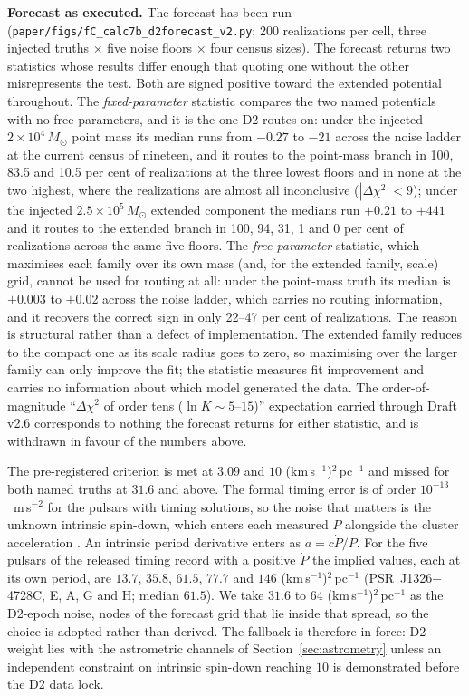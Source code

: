 \documentclass[11pt]{article}
\newcommand{\msun}{\ensuremath{M_\odot}}
\begin{document}
\textbf{Forecast as executed.} The forecast has been run (\texttt{paper/figs/fC\_calc7b\_d2forecast\_v2.py}; 200 realizations per cell, three injected truths $\times$ five noise floors $\times$ four census sizes). The forecast returns two statistics whose results differ enough that quoting one without the other misrepresents the test. Both are signed positive toward the extended potential throughout. The \emph{fixed-parameter} statistic compares the two named potentials with no free parameters, and it is the one D2 routes on: under the injected $2\times10^{4}\,\msun$ point mass its median runs from $-0.27$ to $-21$ across the noise ladder at the current census of nineteen, and it routes to the point-mass branch in 100, 83.5 and 10.5 per cent of realizations at the three lowest floors and in none at the two highest, where the realizations are almost all inconclusive ($|\Delta\chi^{2}|<9$); under the injected $2.5\times10^{5}\,\msun$ extended component the medians run $+0.21$ to $+441$ and it routes to the extended branch in 100, 94, 31, 1 and 0 per cent of realizations across the same five floors. The \emph{free-parameter} statistic, which maximises each family over its own mass (and, for the extended family, scale) grid, cannot be used for routing at all: under the point-mass truth its median is $+0.003$ to $+0.02$ across the noise ladder, which carries no routing information, and it recovers the correct sign in only 22--47 per cent of realizations. The reason is structural rather than a defect of implementation. The extended family reduces to the compact one as its scale radius goes to zero, so maximising over the larger family can only improve the fit; the statistic measures fit improvement and carries no information about which model generated the data. The order-of-magnitude ``$\Delta\chi^{2}$ of order tens ($\ln K \sim 5$--$15$)'' expectation carried through Draft v2.6 corresponds to nothing the forecast returns for either statistic, and is withdrawn in favour of the numbers above.

The pre-registered criterion is met at $3.09$ and $10$ (km\,s$^{-1}$)$^{2}$\,pc$^{-1}$ and missed for both named truths at $31.6$ and above. The formal timing error is of order $10^{-13}$~m\,s$^{-2}$ for the pulsars with timing solutions, so the noise that matters is the unknown intrinsic spin-down, which enters each measured $\dot P$ alongside the cluster acceleration \citep{ColomiBernadich2026}. An intrinsic period derivative enters as $a = c\dot P/P$. For the five pulsars of the released timing record with a positive $\dot P$ the implied values, each at its own period, are $13.7$, $35.8$, $61.5$, $77.7$ and $146$ (km\,s$^{-1}$)$^{2}$\,pc$^{-1}$ (PSR~J1326$-$4728C, E, A, G and H; median $61.5$). We take $31.6$ to $64$ (km\,s$^{-1}$)$^{2}$\,pc$^{-1}$ as the D2-epoch noise, nodes of the forecast grid that lie inside that spread, so the choice is adopted rather than derived. The fallback is therefore in force: D2 weight lies with the astrometric channels of Section~\ref{sec:astrometry} unless an independent constraint on intrinsic spin-down reaching $10$ is demonstrated before the D2 data lock.
\end{document}
